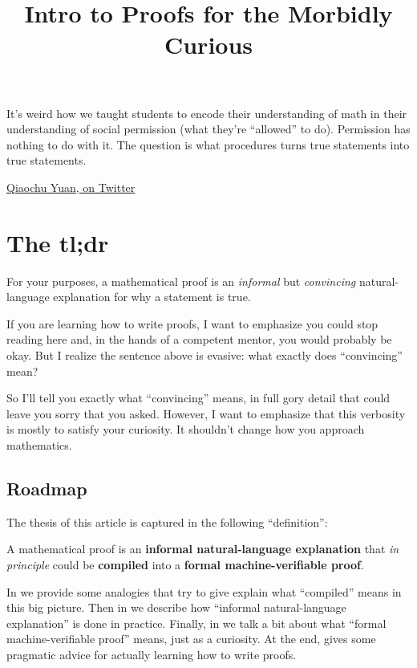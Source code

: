 \documentclass[11pt]{scrartcl}
\begin{document}
\title{Intro to Proofs for the Morbidly Curious}
\maketitle
\epigraph{It's weird how we taught students to encode
  their understanding of math in their understanding of social permission
  (what they're ``allowed'' to do).
  Permission has nothing to do with it.
  The question is what procedures turns true statements into true statements.}
  {\href{https://twitter.com/QiaochuYuan/status/1306035720109404162}{Qiaochu Yuan, on Twitter}}

\tableofcontents

\section{The tl;dr}
\label{sec:tldr}

For your purposes, a \alert{mathematical proof} is an
\emph{informal} but \emph{convincing} natural-language explanation
for why a statement is true.

If you are learning how to write proofs,
I want to emphasize \alert{you could stop reading here} and,
in the hands of a competent mentor, you would probably be okay.
But I realize the sentence above is evasive:
what exactly does ``convincing'' mean?

So I'll tell you exactly what ``convincing'' means,
in full gory detail that could leave you sorry that you asked.
However, I want to emphasize that
\alert{this verbosity is mostly to satisfy your curiosity}.
It shouldn't change how you approach mathematics.

\subsection{Roadmap}
The thesis of this article is captured in the following ``definition'':
\begin{definition}
  A \alert{mathematical proof} is an
  \textbf{informal natural-language explanation}
  that \emph{in principle} could be \textbf{compiled} into a
  \textbf{formal machine-verifiable proof}.
\end{definition}
In  we provide some analogies that try to give
explain what ``compiled'' means in this big picture.
Then in  we describe how
``informal natural-language explanation'' is done in practice.
Finally, in  we talk a bit about
what ``formal machine-verifiable proof'' means, just as a curiosity.
At the end,  gives some pragmatic
advice for actually learning how to write proofs.
\end{document}
